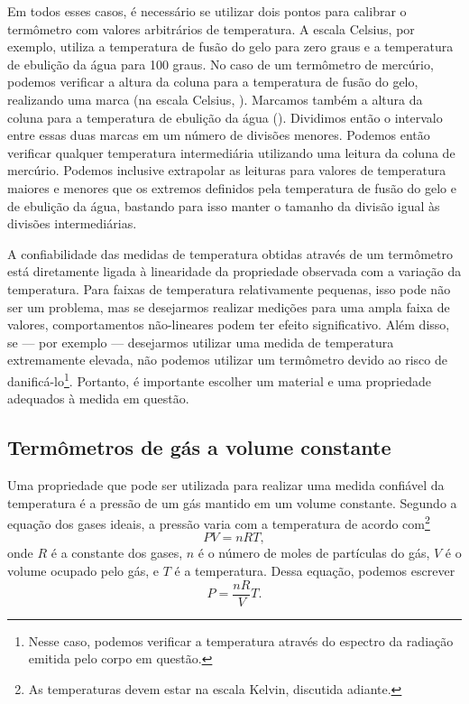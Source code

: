 Em todos esses casos, é necessário se utilizar dois pontos para calibrar o termômetro com valores arbitrários de temperatura. A escala Celsius, por exemplo, utiliza a temperatura de fusão do gelo para zero graus e a temperatura de ebulição da água para 100 graus. No caso de um termômetro de mercúrio, podemos verificar a altura da coluna para a temperatura de fusão do gelo, realizando uma marca (na escala Celsius, ). Marcamos também a altura da coluna para a temperatura de ebulição da água (). Dividimos então o intervalo entre essas duas marcas em um número de divisões menores. Podemos então verificar qualquer temperatura intermediária utilizando uma leitura da coluna de mercúrio. Podemos inclusive extrapolar as leituras para valores de temperatura maiores e menores que os extremos definidos pela temperatura de fusão do gelo e de ebulição da água, bastando para isso manter o tamanho da divisão igual às divisões intermediárias.

A confiabilidade das medidas de temperatura obtidas através de um termômetro está diretamente ligada à linearidade da propriedade observada com a variação da temperatura. Para faixas de temperatura relativamente pequenas, isso pode não ser um problema, mas se desejarmos realizar medições para uma ampla faixa de valores, comportamentos não-lineares podem ter efeito significativo. Além disso, se --- por exemplo --- desejarmos utilizar uma medida de temperatura extremamente elevada, não podemos utilizar um termômetro devido ao risco de danificá-lo\footnote{Nesse caso, podemos verificar a temperatura através do espectro da radiação emitida pelo corpo em questão.}. Portanto, é importante escolher um material e uma propriedade adequados à medida em questão.

\subsection{Termômetros de gás a volume constante}

Uma propriedade que pode ser utilizada para realizar uma medida confiável da temperatura é a pressão de um gás mantido em um volume constante. Segundo a equação dos gases ideais, a pressão varia com a temperatura de acordo com\footnote[][-1cm]{As temperaturas devem estar na escala Kelvin, discutida adiante.}
\begin{equation}
	PV = nRT,
\end{equation}
%
onde $R$ é a constante dos gases, $n$ é o número de moles de partículas do gás, $V$ é o volume ocupado pelo gás, e $T$ é a temperatura. Dessa equação, podemos escrever
\begin{equation}\label{Eq:PvsT}
	P = \frac{nR}{V} T.
\end{equation}

